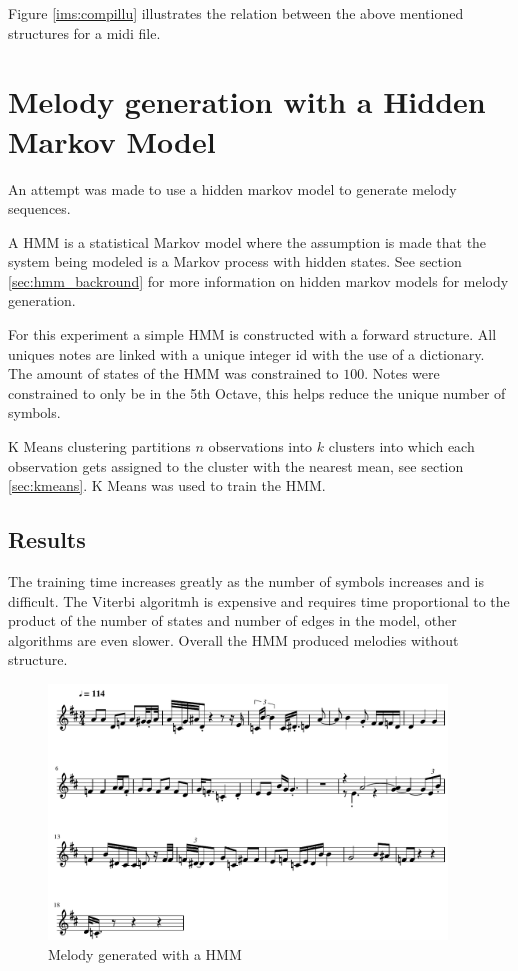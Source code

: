 Figure \ref{ims:compillu} illustrates the relation between the above mentioned structures for a midi file.


\chapter{Melody generation with a Hidden Markov Model}
An attempt was made to use a hidden markov model to generate melody sequences.


A \ac{HMM} is a statistical Markov model where the assumption is made that the system being modeled  is a Markov process with hidden states. See section \ref{sec:hmm_backround} for more information on hidden markov models for melody generation.

For this experiment a simple \ac{HMM} is constructed with a forward structure. All uniques notes are linked with a unique integer id with the use of a dictionary. The amount of states of the \ac{HMM} was constrained to $100$. Notes were constrained to only be in the 5th Octave, this helps reduce the unique number of symbols.

K Means clustering partitions $n$ observations into $k$ clusters into which each observation gets assigned to the cluster with the nearest mean, see section \ref{sec:kmeans}. K Means was used to train the \ac{HMM}.


\section{Results}
The training time increases greatly as the number of symbols increases and is difficult. The Viterbi algoritmh is expensive and requires time proportional to the product of the number of states and number of edges in the model, other algorithms are even slower.
Overall the \ac{HMM} produced melodies without structure.

\begin{figure}
\centerline{\includegraphics[width=400px]{../images/hmm_melody_generated.pdf}}
\caption{Melody generated with a \ac{HMM}}
\label{ims:hmmmelody}
\end{figure}

